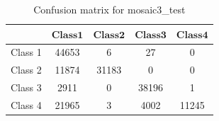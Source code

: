 \documentclass[a4paper, article, oneside, UKenglish]{memoir}
\newcommand{\0}{\mathbf{0}}
\newcommand{\1}{\mathbf{1}}
\begin{document}
\begin{table}[H]
    \centering
    \begin{tabular}{ccccc}
        \toprule
        \(\boldsymbol{}\) & \(\boldsymbol{Class 1}\) & \(\boldsymbol{Class 2}\) & \(\boldsymbol{Class 3}\) & \(\boldsymbol{Class 4}\)
        \\
        \midrule
        Class 1 & 44653 & 6 & 27 & 0
	\\
	Class 2 & 11874 & 31183 & 0 & 0
	\\
	Class 3 & 2911 & 0 & 38196 & 1
	\\
	Class 4 & 21965 & 3 & 4002 & 11245
        \\
        \bottomrule
    \end{tabular}
    \caption{Confusion matrix for mosaic3\_test}
    \label{tab:cm3}
\end{table}


\printbibliography
\end{document}
